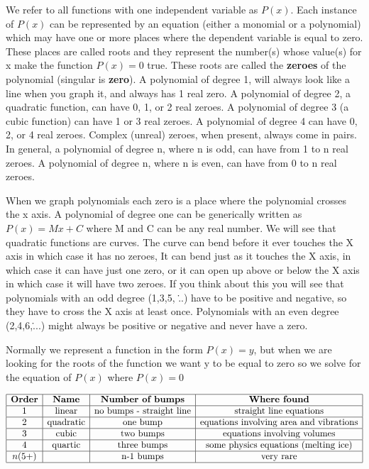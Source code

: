 We refer to all functions with one independent variable as $P(x)$. Each instance of $P(x)$
can be represented by an equation (either a monomial or a polynomial) which may have one
or more places where the dependent variable is equal to zero. These places are called
roots and they represent the number(s) whose value(s) for x make the function $P(x)=0$
true. These roots are called the \textbf{zeroes} of the polynomial (singular is
\textbf{zero}). A polynomial of degree 1, will always look like a line when you graph it,
and always has 1 real zero. A polynomial of degree 2, a quadratic function, can have 0, 1,
or 2 real zeroes. A polynomial of degree 3 (a cubic function) can have 1 or 3 real zeroes.
A polynomial of degree 4 can have 0, 2, or 4 real zeroes. Complex (unreal) zeroes, when
present, always come in pairs. In general, a polynomial of degree n, where n is odd, can
have from 1 to n real zeroes. A polynomial of degree n, where n is even, can have from 0
to n real zeroes.



When we graph polynomials each zero is a place where the polynomial crosses the x axis. A
polynomial of degree one can be generically written as $P(x)=Mx + C$ where M and C can be
any real number. We will see that quadratic functions are curves. The curve can bend
before it ever touches the X axis in which case it has no zeroes, It can bend just as it
touches the X axis, in which case it can have just one zero, or it can open up above or
below the X axis in which case it will have two zeroes. If you think about this you will
see that polynomials with an odd degree (1,3,5, \...) have to be positive and negative, so
they have to cross the X axis at least once. Polynomials with an even degree (2,4,6,\....)
might always be positive or negative and never have a zero.



Normally we represent a function in the form $P(x) = y$, but when we are looking for the
roots of the function we want y to be equal to zero so we solve for the equation of $P(x)$
where $P(x) = 0$



$$\begin{array}{|c|c|c|c|} \hline \textbf{Order} & \textbf{Name} & \textbf{Number of bumps} & \textbf{Where found} \\ \hline 1 & \text{linear} & \text{no bumps - straight line} & \text{straight line equations} \\ \hline 2 & \text{quadratic} & \text{one bump} & \text{equations involving area and vibrations} \\ \hline 3 & \text{cubic} & \text{two bumps} & \text{equations involving volumes} \\ \hline 4 & \text{quartic} & \text{three bumps} & \text{some physics equations (melting ice)} \\ \hline n (5+) & & \text{n-1 bumps} & \text{very rare} \\ \hline \end{array}$$





